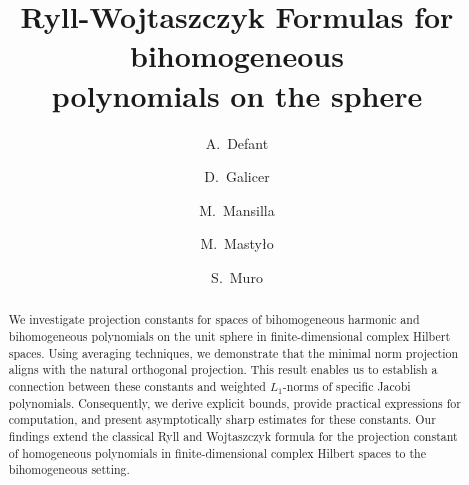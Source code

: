 \documentclass[12pt]{amsart}
\numberwithin{subsection}{section}
\theoremstyle{definition}
\theoremstyle{remark}
\begin{document}
\title[Ryll-Wojtaszczyk Formulas for bihomogeneous polynomials]{Ryll-Wojtaszczyk Formulas for bihomogeneous \\ polynomials on the sphere}


\author[Defant]{A.~Defant}
\address{%
Institut f\"{u}r Mathematik,
Carl von Ossietzky Universit\"at,
26111 Oldenburg,
Germany}


\author[Galicer]{D.~Galicer}   \address{Departamento de Matem\'{a}ticas y Estad\'{\i}stica, Universidad Torcuato Di Tella, Av. Figueroa Alcorta 7350 (1428), Buenos Aires, Argentina and IMAS-CONICET. \tiny{On leave from Departamento de Matematica, FCEyN, Universidad de Buenos Aires.}}  


\author[Mansilla]{M.~Mansilla}
\address{Departamento de Matem\'{a}tica,
Facultad de Cs. Exactas y Naturales, Universidad de Buenos Aires and IAM-CONICET. Saavedra 15 (C1083ACA) C.A.B.A., Argentina}


\author[Masty{\l}o]{M.~Masty{\l}o}
\address{Faculty of Mathematics and Computer Science, Adam Mickiewicz University, Pozna{\'n}, Uniwersytetu
\linebreak
Pozna{\'n}skiego 4,
61-614 Pozna{\'n}, Poland}


\author[Muro]{S.~Muro}
\address{FCEIA, Universidad Nacional de Rosario and CIFASIS, CONICET, Ocampo  $\& $ Esmeralda, S2000 Rosario, Argentina}




\begin{abstract}
We investigate projection constants for spaces of bihomogeneous harmonic and bihomogeneous polynomials on the unit sphere in finite-dimensional complex Hilbert spaces. Using averaging techniques, we demonstrate that the minimal norm projection aligns with the natural orthogonal projection. This result enables us to establish a connection between these constants and weighted  \linebreak $L_1$-norms of specific Jacobi polynomials. Consequently, we derive explicit bounds, provide practical expressions for computation, and present asymptotically sharp estimates for these constants. Our findings extend the classical Ryll and Wojtaszczyk formula for the projection constant of homogeneous polynomials in finite-dimensional complex Hilbert spaces to the bihomogeneous setting.
\end{abstract}
\end{document}
